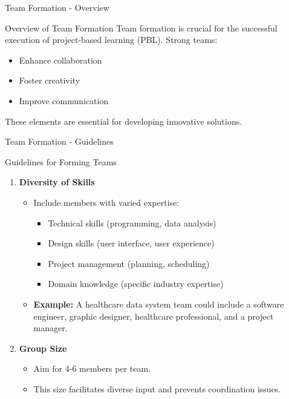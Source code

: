 \documentclass[aspectratio=169]{beamer}
\begin{document}
\begin{frame}[fragile]{Team Formation - Overview}
  \begin{block}{Overview of Team Formation}
    Team formation is crucial for the successful execution of project-based learning (PBL). Strong teams:
    \begin{itemize}
      \item Enhance collaboration
      \item Foster creativity
      \item Improve communication
    \end{itemize}
    These elements are essential for developing innovative solutions.
  \end{block}
\end{frame}

\begin{frame}[fragile]{Team Formation - Guidelines}
  \begin{block}{Guidelines for Forming Teams}
    \begin{enumerate}
      \item \textbf{Diversity of Skills}
        \begin{itemize}
          \item Include members with varied expertise:
          \begin{itemize}
            \item Technical skills (programming, data analysis)
            \item Design skills (user interface, user experience)
            \item Project management (planning, scheduling)
            \item Domain knowledge (specific industry expertise)
          \end{itemize}
          \item \textbf{Example:} A healthcare data system team could include a software engineer, graphic designer, healthcare professional, and a project manager.
        \end{itemize}
        
      \item \textbf{Group Size}
        \begin{itemize}
          \item Aim for 4-6 members per team.
          \item This size facilitates diverse input and prevents coordination issues.
        \end{itemize}
    \end{enumerate}
  \end{block}
\end{frame}
\end{document}
